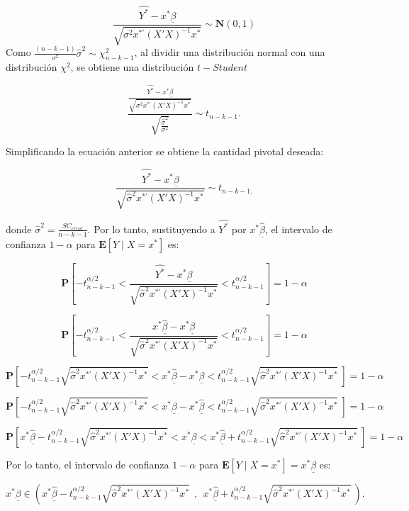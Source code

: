 \documentclass[
  a4paper,
  oneside,
  openany]{book}
\begin{document}
\[\frac{\hat{Y^*}-x^*\underline{\beta}}{\sqrt{\sigma^2 x^{*'}(X'X)^{-1}x^*}}\sim \mathbf{N}(0,1)\]
Como \(\frac{(n-k-1)}{\sigma^2}\hat{\sigma}^2 \sim \chi^2_{n-k-1}\), al dividir una distribución normal con una distribución \(\chi^2\), se obtiene una distribución \(t-Student\)

\[\frac{\frac{\hat{Y^*}-x^*\underline{\beta}}{\sqrt{\sigma^2 x^{*'}(X'X)^{-1}x^*}}}{\sqrt{\frac{\hat{\sigma}^2}{\sigma^2}}} \sim t_{n-k-1}.\]

Simplificando la ecuación anterior se obtiene la cantidad pivotal deseada:

\[\frac{\hat{Y^*}-x^*\underline{\beta}}{\sqrt{\hat{\sigma}^2 x^{*'}(X'X)^{-1}x^*}}\sim t_{n-k-1.}\]

donde \(\hat{\sigma}^2=\frac{SC_{error}}{n-k-1}.\) Por lo tanto, sustituyendo a \(\hat{Y^*}\) por \(x^*\underline{\hat{\beta}}\), el intervalo de confianza \(1-\alpha\) para \(\mathbf{E}[Y \mid X=x^*]\) es:

\[\mathbf{P}\left[ -t^{\alpha/2}_{n-k-1}<\frac{\hat{Y^*}-x^*\underline{\beta}}{\sqrt{\hat{\sigma}^2 x^{*'}(X'X)^{-1}x^*}}  <t^{\alpha/2}_{n-k-1}\right]=1-\alpha\]

\[\mathbf{P}\left[ -t^{\alpha/2}_{n-k-1}<\frac{x^*\underline{\hat{\beta}}-x^*\underline{\beta}}{\sqrt{\hat{\sigma}^2 x^{*'}(X'X)^{-1}x^*}}  <t^{\alpha/2}_{n-k-1}\right]=1-\alpha\]

\[\mathbf{P}\left[ -t^{\alpha/2}_{n-k-1}\sqrt{\hat{\sigma}^2 x^{*'}(X'X)^{-1}x^*}<x^*\underline{\hat{\beta}}-x^*\underline{\beta}  <t^{\alpha/2}_{n-k-1}\sqrt{\hat{\sigma}^2 x^{*'}(X'X)^{-1}x^*} \ \right]=1-\alpha\]

\[\mathbf{P}\left[ -t^{\alpha/2}_{n-k-1}\sqrt{\hat{\sigma}^2 x^{*'}(X'X)^{-1}x^*}<x^*\underline{\beta}-x^*\underline{\hat{\beta}}  <t^{\alpha/2}_{n-k-1}\sqrt{\hat{\sigma}^2 x^{*'}(X'X)^{-1}x^*} \ \right]=1-\alpha\]

\[\mathbf{P}\left[ x^*\underline{\hat{\beta}}-t^{\alpha/2}_{n-k-1}\sqrt{\hat{\sigma}^2 x^{*'}(X'X)^{-1}x^*}<x^*\underline{\beta}  <x^*\underline{\hat{\beta}}+t^{\alpha/2}_{n-k-1}\sqrt{\hat{\sigma}^2 x^{*'}(X'X)^{-1}x^*} \ \right]=1-\alpha\]

Por lo tanto, el intervalo de confianza \(1-\alpha\) para \(\mathbf{E}[Y \mid X=x^*]=x^*\underline{\beta}\) es:

\[x^*\underline{\beta} \in \left(x^*\underline{\hat{\beta}}-t^{\alpha/2}_{n-k-1}\sqrt{\hat{\sigma}^2 x^{*'}(X'X)^{-1}x^*} \ \ , \ \ x^*\underline{\hat{\beta}}+t^{\alpha/2}_{n-k-1}\sqrt{\hat{\sigma}^2 x^{*'}(X'X)^{-1}x^*} \ \right).\]
\end{document}
